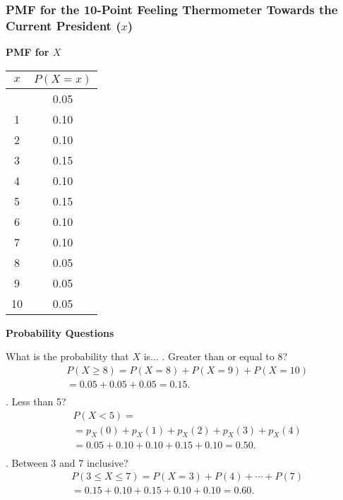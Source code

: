 \documentclass[handout]{beamer} %
\begin{document}
\begin{frame}
\frametitle{PMF for the 10-Point Feeling Thermometer Towards the Current President ($x$)}
    \begin{minipage}[t]{0.3\linewidth}
        \textbf{PMF for \( X \)} \\
        \begin{tabular}{c|c}
            \toprule
            \( x \) & \( P(X=x) \) \\
            \midrule \pause
            0 & 0.05 \\
            1 & 0.10 \\
            2 & 0.10 \\
            3 & 0.15 \\
            4 & 0.10 \\
            5 & 0.15 \\
            6 & 0.10 \\
            7 & 0.10 \\
            8 & 0.05 \\
            9 & 0.05 \\
            10 & 0.05 \\
            \bottomrule
        \end{tabular} \pause
    \end{minipage}%
    \begin{minipage}[t]{0.55\linewidth}

        \textbf{Probability Questions}

\small
What is the probability that  $X$ is... . Greater than or equal to 8? \newline \vspace{-1.5em} \pause
\begin{align*}
   & P(X \geq 8) = P(X=8) + P(X=9) + P(X=10) \\[0.1em]
   & = 0.05 + 0.05 + 0.05 = 0.15. \\[-2em]
\end{align*} . Less than 5?  \newline \vspace{-1.5em} \pause
\begin{align*}
   & P(X < 5) = \\[0.1em]
   & = p_X(0) + p_X(1) + p_X(2) + p_X(3) + p_X(4) \\[0.1em]
   & = 0.05 + 0.10 + 0.10 + 0.15 + 0.10 = 0.50. \\[-2em]
\end{align*} . Between 3 and 7 inclusive?  \newline \vspace{-1.5em} \pause
\begin{align*}
   & P(3 \leq X \leq 7) = P(X=3) + P(4) + \cdots + P(7) \\
   & = 0.15 + 0.10 + 0.15 + 0.10 + 0.10 = 0.60.
\end{align*}

\end{minipage}
\end{frame}
\end{document}
